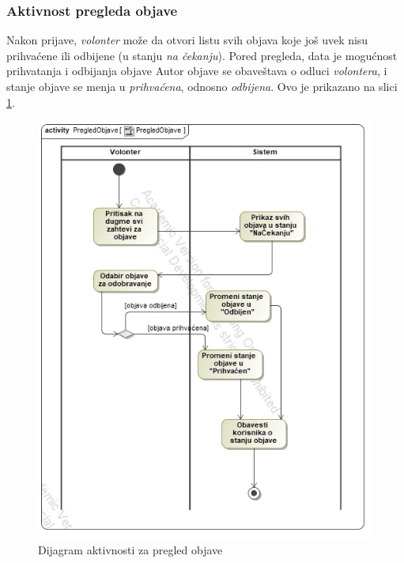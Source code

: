 \subsubsection*{Aktivnost pregleda objave}
\par Nakon prijave, \textit{volonter} može da otvori listu svih objava koje još uvek nisu prihvaćene ili odbijene (u stanju \textit{na čekanju}). Pored pregleda,
data je mogućnost prihvatanja i odbijanja objave Autor objave se obaveštava o odluci \textit{volontera}, i stanje objave se menja u \textit{prihvaćena}, odnosno
\textit{odbijena}. Ovo je prikazano na slici \ref{fig:activity-post-review}.
\begin{figure}[h]
    \centering
    \includegraphics[width=\textwidth, height=\textwidth]{img/activity-post-review.jpg}
    \caption{Dijagram aktivnosti za pregled objave}
    \label{fig:activity-post-review}
\end{figure}


